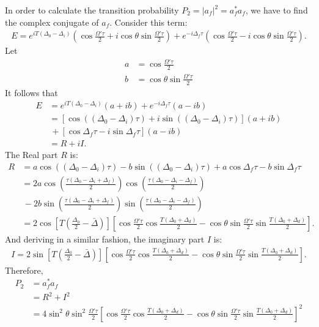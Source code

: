 \documentclass{article}
\begin{document}
In order to calculate the transition probability $P_2 = \vert a_f\vert^2 = a^*_fa_f$, we have to find the complex conjugate of $a_f$. Consider this term:
\begin{align*}
E = e^{iT(\Delta_0-\Delta_i)}
\left(\cos\frac{\Omega'\tau}{2}+i\cos\theta\sin\frac{\Omega'\tau}{2} \right) + e^{-i\Delta_f\tau}\left(\cos\frac{\Omega'\tau}{2}-i\cos\theta\sin\frac{\Omega'\tau}{2} \right).
\end{align*}
Let
\begin{align}
a &= \cos\frac{\Omega'\tau}{2}\\
b &= \cos\theta\sin\frac{\Omega'\tau}{2}
\end{align}
It follows that
\begin{align}
E &= e^{iT(\Delta_0-\Delta_i)}(a+ib) + e^{-i\Delta_f\tau}(a-ib)\nonumber\\
&= \left[\cos\left( (\Delta_0-\Delta_i)\tau\right) + i\sin\left( (\Delta_0-\Delta_i)\tau\right) \right](a+ib)\nonumber\\
& {\,} + \left[\cos\Delta_f\tau - i\sin\Delta_f\tau \right](a-ib)\nonumber\\
&= R + iI.
\end{align}
The Real part $R$ is:
\begin{align}
R &= a\cos\left( (\Delta_0-\Delta_i)\tau\right) -b\sin\left( (\Delta_0-\Delta_i)\tau\right) + a\cos\Delta_f\tau - b\sin\Delta_f\tau\nonumber\\
&= 2a\cos\left(\frac{\tau(\Delta_0-\Delta_i+\Delta_f)}{2} \right) \cos\left(\frac{\tau(\Delta_0-\Delta_i-\Delta_f)}{2} \right) \nonumber\\
&{\,} -2b\sin\left(\frac{\tau(\Delta_0-\Delta_i+\Delta_f)}{2} \right) \sin\left(\frac{\tau(\Delta_0-\Delta_i-\Delta_f)}{2} \right)\nonumber\\
&= 2\cos\left[T\left( \frac{\Delta_0}{2} - \bar{\Delta}\right)  \right]\left[\cos\frac{\Omega'\tau}{2}\cos\frac{T(\Delta_0+\Delta_d)}{2} - \cos\theta\sin\frac{\Omega'\tau}{2}\sin\frac{T(\Delta_0 + \Delta_d)}{2}\right].
\end{align}
And deriving in a similar fashion, the imaginary part $I$ is:
\begin{align}
I = 2\sin\left[T\left( \frac{\Delta_0}{2} - \bar{\Delta}\right)  \right]\left[\cos\frac{\Omega'\tau}{2}\cos\frac{T(\Delta_0+\Delta_d)}{2} - \cos\theta\sin\frac{\Omega'\tau}{2}\sin\frac{T(\Delta_0 + \Delta_d)}{2}\right].
\end{align}
Therefore, 
\begin{align}
P_2 &= a_f^*a_f\nonumber\\
&= R^2 + I^2\nonumber\\
&= 4\sin^2\theta\sin^2\frac{\Omega'\tau}{2}\left[\cos\frac{\Omega'\tau}{2}\cos\frac{T(\Delta_0+\Delta_d)}{2} - \cos\theta\sin\frac{\Omega'\tau}{2}\sin\frac{T(\Delta_0 + \Delta_d)}{2} \right] ^2
\end{align}
\end{document}
